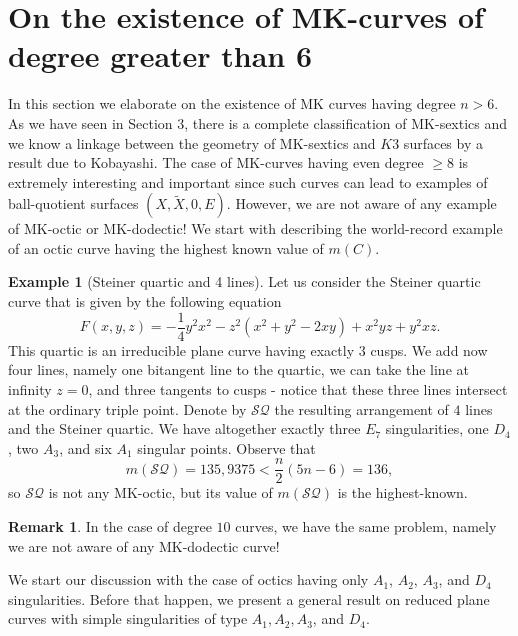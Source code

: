 \documentclass[11pt]{amsart}
\theoremstyle{plain}
\theoremstyle{definition}
\newtheorem{remark}[thm]{Remark}
\newtheorem{example}[thm]{Example}
\numberwithin{equation}{section}
\begin{document}
\section{On the existence of MK-curves of degree greater than 6}
In this section we elaborate on the existence of MK curves having degree $n>6$. As we have seen in Section $3$, there is a complete classification of MK-sextics and we know a linkage between the geometry of MK-sextics and $K3$ surfaces by a result due to Kobayashi. The case of MK-curves having even degree $\geq 8$ is extremely interesting and important since such curves can lead to examples of ball-quotient surfaces $(X,\tilde{X},0,E)$. However, we are not aware of any example of MK-octic or MK-dodectic! We start with describing the world-record example of an octic curve having the highest known value of $m(C)$.
\begin{example}[Steiner quartic and 4 lines] Let us consider the Steiner quartic curve that is given by the following equation
$$F(x,y,z) = -\frac{1}{4}y^{2}x^{2}-z^{2}(x^{2}+y^{2}-2xy)+x^{2}yz + y^{2}xz.$$
This quartic is an irreducible plane curve having exactly $3$ cusps. We add now four lines, namely one bitangent line to the quartic, we can take the line at infinity $z=0$, and three tangents to cusps - notice that these three lines intersect at the ordinary triple point. Denote by $\mathcal{SQ}$ the resulting arrangement of $4$ lines and the Steiner quartic. We have altogether exactly three $E_7$ singularities, one $D_{4}$, two $A_{3}$, and six $A_{1}$ singular points. Observe that
$$m(\mathcal{SQ}) = 135,9375 < \frac{n}{2}(5n-6) = 136,$$
so $\mathcal{SQ}$ is not any MK-octic, but its value of $m(\mathcal{SQ})$ is the highest-known.
\end{example}
\begin{remark}
In the case of degree $10$ curves, we have the same problem, namely we are not aware of any MK-dodectic curve! 
\end{remark}
We start our discussion with the case of octics having only $A_{1}$, $A_{2}$, $A_{3}$, and $D_{4}$ singularities. Before that happen, we present a general result on reduced plane curves with simple singularities of type $A_{1}, A_{2}, A_{3}$, and $D_{4}$. 
\end{document}
